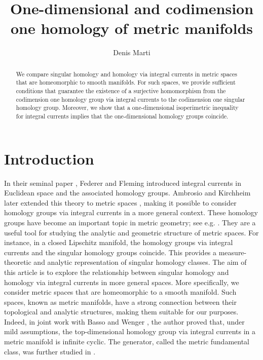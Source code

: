 \documentclass{amsart}
\author{Denis Marti}
\title[One-dimensional and codimension one homology of metric manifolds]{One-dimensional and codimension one homology of metric manifolds}
\numberwithin{equation}{section}
\begin{document}
\begin{abstract}
We compare singular homology and homology via integral currents in metric spaces that are homeomorphic to smooth manifolds. For such spaces, we provide sufficient conditions that guarantee the existence of a surjective homomorphism from the codimension one homology group via integral currents to the codimension one singular homology group. Moreover, we show that a one-dimensional isoperimetric inequality for integral currents implies that the one-dimensional homology groups coincide. 
\end{abstract}

    

\maketitle


\section{Introduction}
    In their seminal paper \cite{fed-flem}, Federer and Fleming introduced integral currents in Euclidean space and the associated homology groups. Ambrosio and Kirchheim later extended this theory to metric spaces \cite{ambrosio-kirchheim-2000}, making it possible to consider homology groups via integral currents in a more general context. These homology groups have become an important topic in metric geometry; see e.g. \cite{depauw-pfeffer-hardt,quasiflats,song2022spherical,wenger-flat-conv}. They are a useful tool for studying the analytic and geometric structure of metric spaces. For instance, in a closed Lipschitz manifold, the homology groups via integral currents and the singular homology groups coincide. This provides a measure-theoretic and analytic representation of singular homology classes. The aim of this article is to explore the relationship between singular homology and homology via integral currents in more general spaces. More specifically, we consider metric spaces that are homeomorphic to a smooth manifold. Such spaces, known as metric manifolds, have a strong connection between their topological and analytic structures, making them suitable for our purposes. Indeed, in joint work with Basso and Wenger \cite{basso2023geometric}, the author proved that, under mild assumptions, the top-dimensional homology group via integral currents in a metric manifold is infinite cyclic. The generator, called the metric fundamental class, was further studied in \cite{denis-non-orientable,marti2024characterization}.
\end{document}
